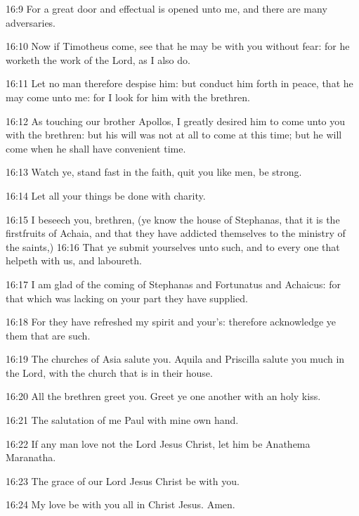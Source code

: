 16:9 For a great door and effectual is opened unto me, and there are many adversaries.

16:10 Now if Timotheus come, see that he may be with you without fear: for he worketh the work of the Lord, as I also do.

16:11 Let no man therefore despise him: but conduct him forth in peace, that he may come unto me: for I look for him with the brethren.

16:12 As touching our brother Apollos, I greatly desired him to come unto you with the brethren: but his will was not at all to come at this time; but he will come when he shall have convenient time.

16:13 Watch ye, stand fast in the faith, quit you like men, be strong.

16:14 Let all your things be done with charity.

16:15 I beseech you, brethren, (ye know the house of Stephanas, that it is the firstfruits of Achaia, and that they have addicted themselves to the ministry of the saints,) 16:16 That ye submit yourselves unto such, and to every one that helpeth with us, and laboureth.

16:17 I am glad of the coming of Stephanas and Fortunatus and Achaicus: for that which was lacking on your part they have supplied.

16:18 For they have refreshed my spirit and your's: therefore acknowledge ye them that are such.

16:19 The churches of Asia salute you. Aquila and Priscilla salute you much in the Lord, with the church that is in their house.

16:20 All the brethren greet you. Greet ye one another with an holy kiss.

16:21 The salutation of me Paul with mine own hand.

16:22 If any man love not the Lord Jesus Christ, let him be Anathema Maranatha.

16:23 The grace of our Lord Jesus Christ be with you.

16:24 My love be with you all in Christ Jesus. Amen.

